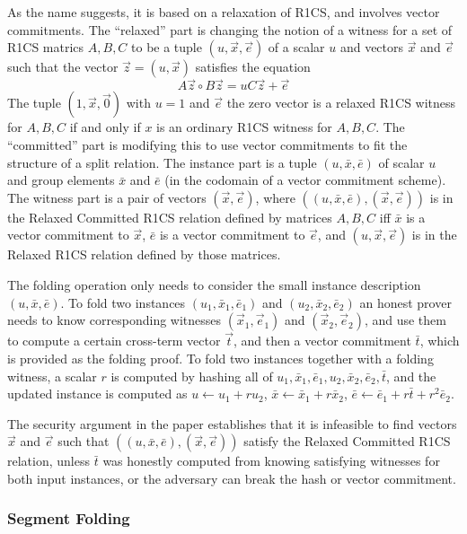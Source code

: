 \documentclass{article}
\theoremstyle{plain}
\theoremstyle{definition}
\begin{document}
As the name suggests, it is based on a relaxation of R1CS, and involves vector commitments.
The ``relaxed'' part is changing the notion of a witness for a set of R1CS matrics
$A,B,C$ to be a tuple $(u,\vec{x},\vec{e})$ of a scalar $u$ and vectors $\vec{x}$ and $\vec{e}$
such that the vector $\vec{z} = (u,\vec{x})$ satisfies the equation
\[A\vec{z} \circ B\vec{z} = uC\vec{z} + \vec{e}\]
The tuple $(1,\vec{x},\vec{0})$ with $u = 1$ and $\vec{e}$ the zero vector is a
relaxed R1CS witness for $A,B,C$ if and only if $x$ is an ordinary R1CS witness for $A,B,C$.
The ``committed'' part is modifying this to use vector commitments to fit the
structure of a split relation.
The instance part is a tuple $(u,\bar{x},\bar{e})$ of scalar $u$ and group elements
$\bar{x}$ and $\bar{e}$
(in the codomain of a vector commitment scheme).
The witness part is a pair of vectors $(\vec{x},\vec{e})$, where
$((u,\bar{x},\bar{e}),(\vec{x},\vec{e}))$ is in the Relaxed Committed R1CS
relation defined by matrices $A,B,C$ iff $\bar{x}$ is a vector commitment to $\vec{x}$,
$\bar{e}$ is a vector commitment to $\vec{e}$, and $(u,\vec{x},\vec{e})$ is in the
Relaxed R1CS relation defined by those matrices.

The folding operation only needs to consider the small instance description $(u,\bar{x},\bar{e})$.
To fold two instances $(u_1,\bar{x}_1,\bar{e}_1)$ and $(u_2,\bar{x}_2,\bar{e}_2)$ an
honest prover needs to know corresponding witnesses $(\vec{x}_1,\vec{e}_1)$ and
$(\vec{x}_2,\vec{e}_2)$, and use them to compute a certain cross-term vector $\vec{t}$,
and then a vector commitment $\bar{t}$, which is provided as the folding proof.
To fold two instances together with a folding witness, a scalar $r$
is computed by hashing all of
$u_1,\bar{x}_1,\bar{e}_1,u_2,\bar{x}_2,\bar{e}_2,\bar{t}$, and the updated instance is
computed as $u \leftarrow u_1 + r u_2$, $\bar{x} \leftarrow \bar{x}_1 + r \bar{x}_2$,
$\bar{e} \leftarrow \bar{e}_1 + r \bar{t} + r^2 \bar{e}_2$.

The security argument in the paper establishes that it is infeasible to find vectors
$\vec{x}$ and $\vec{e}$ such that $((u,\bar{x},\bar{e}),(\vec{x},\vec{e}))$ satisfy
the Relaxed Committed R1CS relation, unless $\bar{t}$ was honestly computed from
knowing satisfying witnesses for both input instances, or the adversary can break the
hash or vector commitment.

\subsubsection{Segment Folding}\label{segment-inputs}
\end{document}
